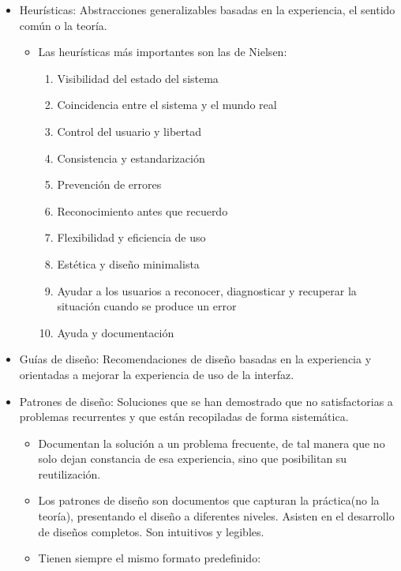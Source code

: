 \documentclass[12pt, twoside, openright]{report} %
\begin{document}
\begin{itemize}
    \begin{itemize}
    
    \item
      Heurísticas: Abstracciones generalizables basadas en la
      experiencia, el sentido común o la teoría.

      \begin{itemize}
      
      \item
        Las heurísticas más importantes son las de Nielsen:

        \begin{enumerate}
        \def\labelenumi{\arabic{enumi}.}
        
        \item
          Visibilidad del estado del sistema
        \item
          Coincidencia entre el sistema y el mundo real
        \item
          Control del usuario y libertad
        \item
          Consistencia y estandarización
        \item
          Prevención de errores
        \item
          Reconocimiento antes que recuerdo
        \item
          Flexibilidad y eficiencia de uso
        \item
          Estética y diseño minimalista
        \item
          Ayudar a los usuarios a reconocer, diagnosticar y recuperar la
          situación cuando se produce un error
        \item
          Ayuda y documentación
        \end{enumerate}
      \end{itemize}
    \item
      Guías de diseño: Recomendaciones de diseño basadas en la
      experiencia y orientadas a mejorar la experiencia de uso de la
      interfaz.
	  \pagebreak
    \item
      Patrones de diseño: Soluciones que se han demostrado que no
      satisfactorias a problemas recurrentes y que están recopiladas de
      forma sistemática.

      \begin{itemize}
      
      \item
        Documentan la solución a un problema frecuente, de tal manera
        que no solo dejan constancia de esa experiencia, sino que
        posibilitan su reutilización.
      \item
        Los patrones de diseño son documentos que capturan la
        práctica(no la teoría), presentando el diseño a diferentes
        niveles. Asisten en el desarrollo de diseños completos. Son
        intuitivos y legibles.
      \item
        Tienen siempre el mismo formato predefinido:


\end{itemize}
\end{itemize}
\end{itemize}
\end{document}
